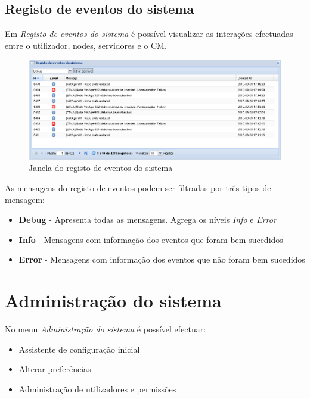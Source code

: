 \subsection{Registo de eventos do sistema}
\label{sec:system_event_reg}

Em \emph{Registo de eventos do sistema} é possível visualizar as interações efectuadas entre o utilizador, nodes, servidores e o CM.

\begin{figure}[H]
	\begin{center}
	\includegraphics[scale=0.5]{screenshots/events_log.png}
	\caption{Janela do registo de eventos do sistema}
	\label{fig:events_log}
	\end{center}
\end{figure}

As mensagens do registo de eventos podem ser filtradas por três tipos de mensagem:
\begin{itemize}
    \item {\bf Debug} - Apresenta todas as mensagens. Agrega os níveis \emph{Info} e \emph{Error}
    \item {\bf Info} - Mensagens com informação dos eventos que foram bem sucedidos
    \item {\bf Error} - Mensagens com informação dos eventos que não foram bem sucedidos
\end{itemize}

\section{Administração do sistema}
\label{sec:first_time_wizard}
No menu \emph{Administração do sistema} é possível efectuar:
\begin{itemize}
\item Assistente de configuração inicial
\item Alterar preferências
\item Administração de utilizadores e permissões
\end{itemize}

